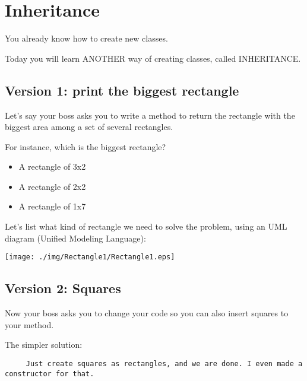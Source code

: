 \documentclass[a4paper, 9pt]{extarticle}
\begin{document}
\section{Inheritance}

You already know how to create new classes.

Today you will learn ANOTHER way of creating classes, called INHERITANCE.

\subsection{Version 1: print the biggest rectangle}

Let's say your boss asks you to write a method to return the rectangle with the
biggest area among a set of several rectangles.

For instance, which is the biggest rectangle?

\begin{itemize}
  \item A rectangle of 3x2
  \item A rectangle of 2x2
  \item A rectangle of 1x7
\end{itemize}

\begin{multicols}{2}
\columnbreak

  Let's list what kind of rectangle we need to solve the problem, using an UML
  diagram (Unified Modeling Language):

  \begin{center}
    \texttt{[image: ./img/Rectangle1/Rectangle1.eps]}
  \end{center}
\end{multicols}



\subsection{Version 2: Squares}

Now your boss asks you to change your code so you can also insert squares to
your method.

The simpler solution:

\verb+     Just create squares as rectangles, and we are done. I even made a constructor for that.+
\end{document}

